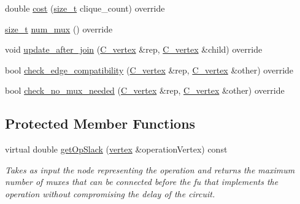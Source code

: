 \begin{DoxyCompactItemize}
\item 
double \hyperlink{structmodule__binding__check_a7ab5b520f8ab3065e15a4726a61995b7}{cost} (\hyperlink{tutorial__fpt__2017_2intro_2sixth_2test_8c_a7c94ea6f8948649f8d181ae55911eeaf}{size\+\_\+t} clique\+\_\+count) override
\item 
\hyperlink{tutorial__fpt__2017_2intro_2sixth_2test_8c_a7c94ea6f8948649f8d181ae55911eeaf}{size\+\_\+t} \hyperlink{structmodule__binding__check_af4e3de311ec8e1aa996ebf0655faf0c5}{num\+\_\+mux} () override
\item 
void \hyperlink{structmodule__binding__check_ae76cbfa7bdfffd10adf7033c67224798}{update\+\_\+after\+\_\+join} (\hyperlink{clique__covering__graph_8hpp_a9cb45047ea8c5ed95a8cfa90494345aa}{C\+\_\+vertex} \&rep, \hyperlink{clique__covering__graph_8hpp_a9cb45047ea8c5ed95a8cfa90494345aa}{C\+\_\+vertex} \&child) override
\item 
bool \hyperlink{structmodule__binding__check_a36a3f9d2c01d19f8a3d4b0a2bbc0d021}{check\+\_\+edge\+\_\+compatibility} (\hyperlink{clique__covering__graph_8hpp_a9cb45047ea8c5ed95a8cfa90494345aa}{C\+\_\+vertex} \&rep, \hyperlink{clique__covering__graph_8hpp_a9cb45047ea8c5ed95a8cfa90494345aa}{C\+\_\+vertex} \&other) override
\item 
bool \hyperlink{structmodule__binding__check_a4bea04fdfc26b2ec8c1f98f7b1fff592}{check\+\_\+no\+\_\+mux\+\_\+needed} (\hyperlink{clique__covering__graph_8hpp_a9cb45047ea8c5ed95a8cfa90494345aa}{C\+\_\+vertex} \&rep, \hyperlink{clique__covering__graph_8hpp_a9cb45047ea8c5ed95a8cfa90494345aa}{C\+\_\+vertex} \&other) override
\end{DoxyCompactItemize}
\subsection*{Protected Member Functions}
\begin{DoxyCompactItemize}
\item 
virtual double \hyperlink{structmodule__binding__check_a646dd22cb75e1b178f4291587d628721}{get\+Op\+Slack} (\hyperlink{graph_8hpp_abefdcf0544e601805af44eca032cca14}{vertex} \&operation\+Vertex) const
\begin{DoxyCompactList}\small\item\em Takes as input the node representing the operation and returns the maximum number of muxes that can be connected before the fu that implements the operation without compromising the delay of the circuit. \end{DoxyCompactList}\end{DoxyCompactItemize}
